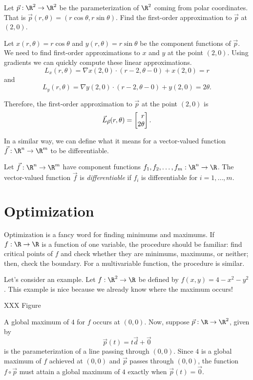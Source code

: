 \begin{example}
	Let $\vec p:\R^2\to\R^2$ be the parameterization of $\R^2$ coming from
	polar coordinates.  That is $\vec p(r,\theta) = (r\cos\theta,r\sin\theta)$.
	Find the first-order approximation to $\vec p$ at $(2,0)$.

	Let $x(r,\theta)=r\cos\theta$ and $y(r,\theta)=r\sin\theta$ be the component
	functions of $\vec p$.  We need to find first-order approximations to $x$ and $y$
	at the point $(2,0)$.  Using gradients we can quickly compute these linear
	approximations.
	\[
		L_x(r,\theta) = \nabla x(2,0)\cdot(r-2,\theta-0) + x(2,0)= r
	\]
	and
	\[
		L_y(r,\theta) = \nabla y(2,0)\cdot(r-2,\theta-0) + y(2,0)= 2\theta.
	\]

	Therefore, the first-order approximation to $\vec p$ at the point $(2,0)$ is
	\[
		\vec L_{\vec p}(r,\theta) = \mat{r\\2\theta}.
	\]
\end{example}

In a similar way, we can define what it means for a vector-valued function
$\vec f:\R^n\to\R^m$ to be differentiable.

\begin{definition}
	Let $\vec f:\R^n\to\R^m$ have component functions
	$f_1,f_2,\ldots,f_m:\R^n\to\R$.  The vector-valued function $\vec f$
	is \emph{differentiable} if $f_i$ is differentiable for
	$i=1,\ldots,m$.
\end{definition}

\section{Optimization}

Optimization is a fancy word for finding minimums and maximums.  If
$f:\R\to\R$ is a function of one variable, the procedure should be
familiar: find critical points of $f$ and check whether they are
minimums, maximums, or neither; then, check the boundary.  For
a multivariable function, the procedure is similar.

Let's consider an example.  Let $f:\R^2\to\R$ be defined by $f(x,y)=4-x^2-y^2$.
This example is nice because we already know where the maximum occurs!

XXX Figure

A global maximum of $4$ for $f$ occurs at $(0,0)$.  Now, suppose $\vec p:\R\to\R^2$, given
by
\[
	\vec p(t) = t\vec d+\vec 0
\]
is the parameterization of a line passing through $(0,0)$.  Since $4$ is a global
maximum of $f$ achieved at $(0,0)$ and $\vec p$ passes through $(0,0)$, the function
$f\circ \vec p$ must attain a global maximum of $4$ exactly when $\vec p(t)=\vec 0$.

